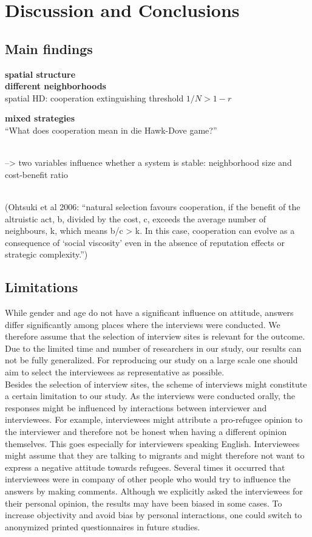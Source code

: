 \section{Discussion and Conclusions}

\subsection{Main findings}

\textbf{spatial structure}\\
\textbf{different neighborhoods}\\
spatial HD: cooperation extinguishing threshold $1 / N > 1 - r$

\textbf{mixed strategies}\\

``What does cooperation mean in die Hawk-Dove game?''

\\
--> two variables influence whether a system is stable: neighborhood size and cost-benefit ratio

\\
(Ohtsuki et al 2006:
 ``natural selection favours cooperation, if the
 benefit of the altruistic act, b, divided by the cost, c, exceeds the
 average number of neighbours, k, which means b/c > k. In this
 case, cooperation can evolve as a consequence of ‘social viscosity’
 even in the absence of reputation effects or strategic complexity.'')
 

\subsection{Limitations}
While gender and age do not have a significant influence on attitude, answers differ significantly among places where the interviews were conducted. We therefore assume that the selection of interview sites is relevant for the outcome. Due to the limited time and number of researchers in our study, our results can not be fully generalized. For reproducing our study on a large scale one should aim to select the interviewees as representative as possible.\\
Besides the selection of interview sites, the scheme of interviews might constitute a certain limitation to our study. As the interviews were conducted orally, the responses might be influenced by interactions between interviewer and interviewees. For example, interviewees might attribute a pro-refugee opinion to the interviewer and therefore not be honest when having a different opinion themselves. This goes especially for interviewers speaking English. Interviewees might assume that they are talking to migrants and might therefore not want to express a negative attitude towards refugees. Several times it occurred that interviewees were in company of other people who would try to influence the answers by making comments. Although we explicitly asked the interviewees for their personal opinion, the results may have been biased in some cases. To increase objectivity and avoid bias by personal interactions, one could switch to anonymized printed questionnaires in future studies.\\

